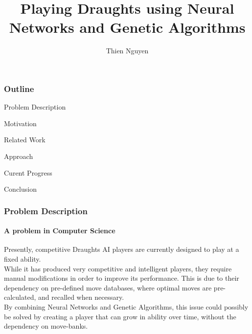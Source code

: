 \documentclass{beamer}
\title[NN and GA To Play Draughts] %
	{Playing Draughts using Neural Networks and Genetic Algorithms}
\author[T. Nguyen] %
	{Thien Nguyen}
\institute[Durham] %
	{
	Department of Computer Science\\
	Durham University
	}
\begin{document}
\pgfplotsset{compat=1.15}

\frame{\titlepage}

\begin{frame}

  \frametitle{Outline}
	\begin{block}{Problem Description}
	 \end{block}
	\begin{block}{Motivation}
	\end{block}
	\begin{block}{Related Work}
	\end{block}
	\begin{block}{Approach}
	\end{block}
	\begin{block}{Curent Progress}
	\end{block}
	\begin{block}{Conclusion}
	\end{block}
	  
  
\end{frame}

\begin{frame}
  \frametitle{Problem Description}
  \framesubtitle{A problem in Computer Science}
	Presently, competitive Draughts AI players are currently designed to play at a fixed ability. \\
	While it has produced very competitive and intelligent players, they require manual modifications in order to improve its performance. This is due to their dependency on pre-defined move databases, where optimal moves are pre-calculated, and recalled when necessary. \\
	By combining Neural Networks and Genetic Algorithms, this issue could possibly be solved by creating a player that can grow in ability over time, without the dependency on move-banks.


\end{frame}
\end{document}
